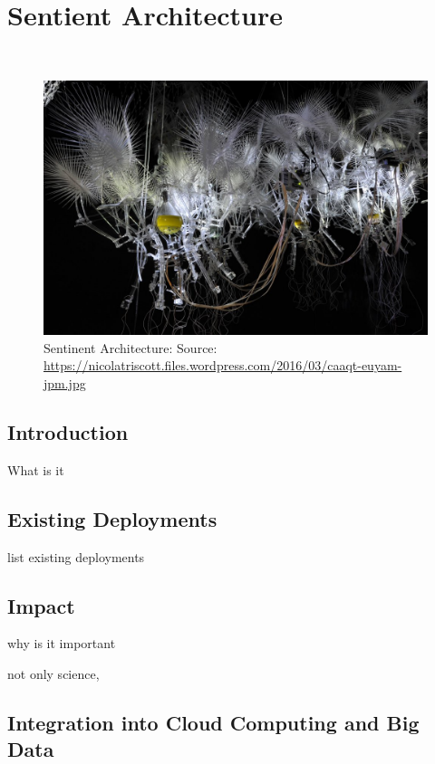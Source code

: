 

\chapter{Sentient Architecture}

\FILENAME\

\begin{figure}
\centering
\includegraphics[width=\columnwidth]{images/sentient.jpeg}
\caption{Sentinent Architecture: Source: \url{https://nicolatriscott.files.wordpress.com/2016/03/caaqt-euyam-jpm.jpg}} 
\end{figure}

\section{Introduction}

What is it

\section{Existing Deployments}

list	existing deployments

\section{Impact}

why is it important

not only science, 

\section{Integration into Cloud Computing and Big Data}

